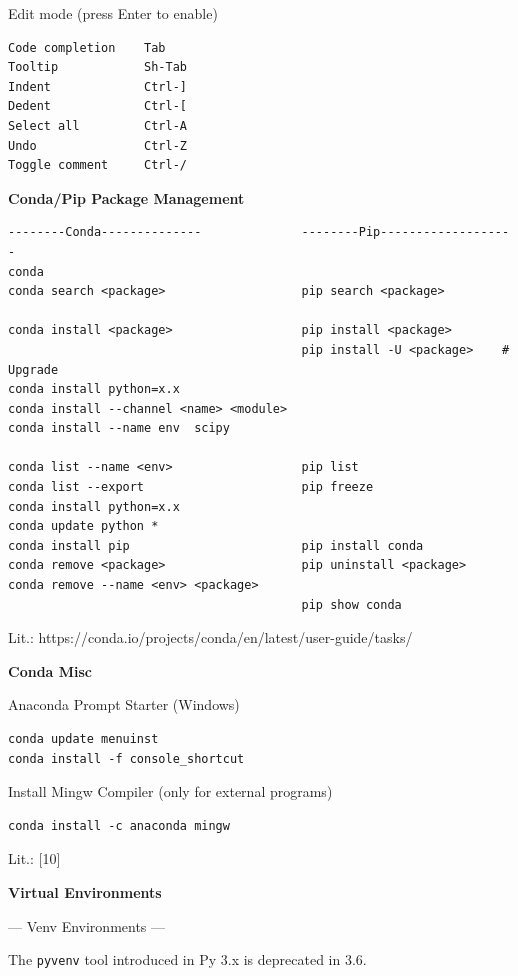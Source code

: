 \documentclass[9pt,a4wide]{extarticle}
\begin{document}
Edit mode (press Enter to enable)

\begin{verbatim}      
Code completion    Tab
Tooltip            Sh-Tab
Indent             Ctrl-]
Dedent             Ctrl-[
Select all         Ctrl-A
Undo               Ctrl-Z
Toggle comment     Ctrl-/
\end{verbatim}      


\medskip
{\bf Conda/Pip Package Management}

\begin{verbatim}
--------Conda--------------              --------Pip-------------------
conda 
conda search <package>                   pip search <package>

conda install <package>                  pip install <package>
                                         pip install -U <package>    # Upgrade
conda install python=x.x  
conda install --channel <name> <module>
conda install --name env  scipy

conda list --name <env>                  pip list
conda list --export                      pip freeze
conda install python=x.x
conda update python *
conda install pip                        pip install conda
conda remove <package>                   pip uninstall <package>
conda remove --name <env> <package>
                                         pip show conda
\end{verbatim}

Lit.: https://conda.io/projects/conda/en/latest/user-guide/tasks/

\medskip

{\bf Conda Misc}

Anaconda Prompt Starter (Windows)

\begin{verbatim}
conda update menuinst
conda install -f console_shortcut
\end{verbatim}

Install Mingw Compiler (only for external
programs)

\begin{verbatim}
conda install -c anaconda mingw
\end{verbatim}


Lit.: [10]


\medskip
{\bf Virtual Environments}

--- Venv Environments ---

The {\tt pyvenv} tool introduced in Py 3.x is deprecated in 3.6.
\end{document}

